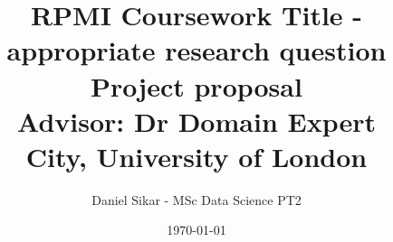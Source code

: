 \documentclass[a4paper,12pt]{article} %
\begin{document}
\title{%
  RPMI Coursework Title - appropriate research question \\
  \large Project proposal \\
    Advisor: Dr Domain Expert \\
    City, University of London}
\author{Daniel Sikar - MSc Data Science PT2}
\date{\today} %

\maketitle %



% 










\end{document}
